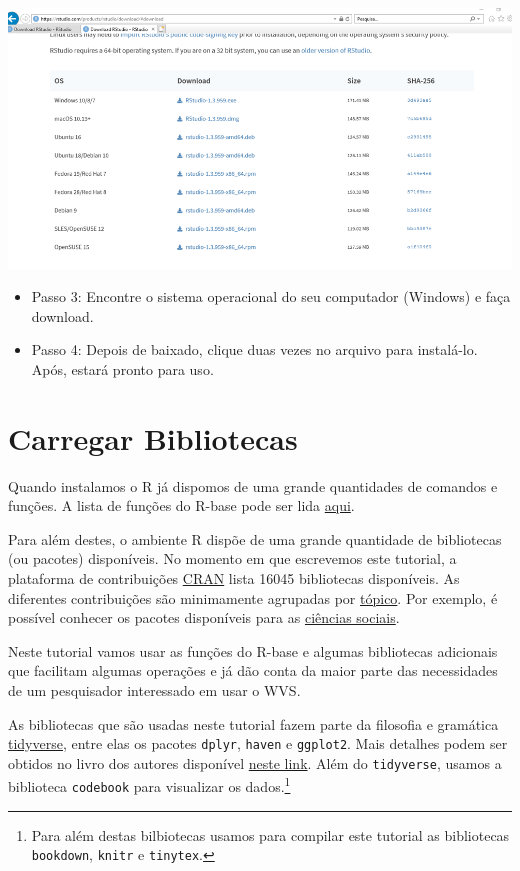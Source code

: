 \documentclass[
  brazil,
]{book}
\providecommand{\tightlist}{%
  \setlength{\itemsep}{0pt}\setlength{\parskip}{0pt}}
\begin{document}
\includegraphics[width=13.54in]{img/inst_1_rstudio}

\begin{itemize}
\tightlist
\item
  Passo 3: Encontre o sistema operacional do seu computador (Windows) e faça download.
\item
  Passo 4: Depois de baixado, clique duas vezes no arquivo para instalá-lo. Após, estará pronto para uso.
\end{itemize}

\hypertarget{carregar-bibliotecas}{%
\chapter{Carregar Bibliotecas}\label{carregar-bibliotecas}}

Quando instalamos o R já dispomos de uma grande quantidades de comandos e funções. A lista de funções do R-base pode ser lida \href{https://stat.ethz.ch/R-manual/R-devel/library/base/html/00Index.html}{aqui}.

Para além destes, o ambiente R dispõe de uma grande quantidade de bibliotecas (ou pacotes) disponíveis. No momento em que escrevemos este tutorial, a plataforma de contribuições \href{https://cran.r-project.org/web/packages/}{CRAN} lista 16045 bibliotecas disponíveis. As diferentes contribuições são minimamente agrupadas por \href{https://cran.r-project.org/web/views/}{tópico}. Por exemplo, é possível conhecer os pacotes disponíveis para as \href{https://cran.r-project.org/web/views/SocialSciences.html}{ciências sociais}.

Neste tutorial vamos usar as funções do R-base e algumas bibliotecas adicionais que facilitam algumas operações e já dão conta da maior parte das necessidades de um pesquisador interessado em usar o WVS.

As bibliotecas que são usadas neste tutorial fazem parte da filosofia e gramática \href{https://www.tidyverse.org/}{tidyverse}, entre elas os pacotes \texttt{dplyr}, \texttt{haven} e \texttt{ggplot2}. Mais detalhes podem ser obtidos no livro dos autores disponível \href{https://r4ds.had.co.nz/}{neste link}. Além do \texttt{tidyverse}, usamos a biblioteca \texttt{codebook} para visualizar os dados.\footnote{Para além destas bilbiotecas usamos para compilar este tutorial as bibliotecas \texttt{bookdown}, \texttt{knitr} e \texttt{tinytex}.}
\end{document}
